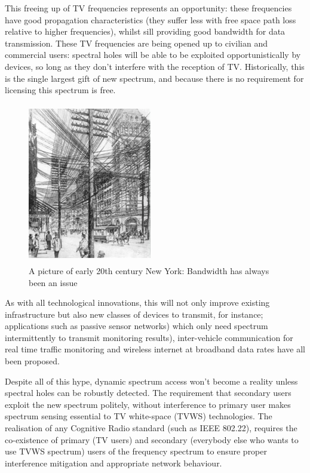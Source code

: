 \documentclass[12pt, a4paper]{article}
\begin{document}
This freeing up of TV frequencies represents an opportunity: these frequencies have good propagation characteristics (they suffer less with free space path loss relative to higher frequencies), whilst sill providing good bandwidth for data transmission. These TV frequencies are being opened up to civilian and  commercial users: spectral holes will be able to be exploited opportunistically by devices, so long as they don't interfere with the reception of TV. Historically, this is the single largest gift of new spectrum, and because there is no requirement for licensing this spectrum is free.

\begin{figure}
\centering
\includegraphics[width=0.48\textwidth, height = 7cm]{cablesnewyork.jpg}
\caption{A picture of early 20th century New York: Bandwidth has always been an issue}
\label{newyork}
\end{figure}

As with all technological innovations, this will not only improve existing infrastructure but also new classes of devices to transmit, for instance; applications such as passive sensor networks) which only need spectrum intermittently to transmit monitoring results), inter-vehicle communication for real time traffic monitoring and wireless internet at broadband data rates have all been proposed.

Despite all of this hype, dynamic spectrum access won't become a reality unless spectral holes can be robustly detected. The requirement that secondary users exploit the new spectrum politely, without interference to primary user makes spectrum sensing essential to TV white-space (TVWS) technologies. The realisation of any Cognitive Radio standard (such as IEEE 802.22), requires the co-existence of primary (TV users) and secondary (everybody else who wants to use TVWS spectrum) users of the frequency spectrum to ensure proper interference mitigation and appropriate network behaviour. 
\end{document}
